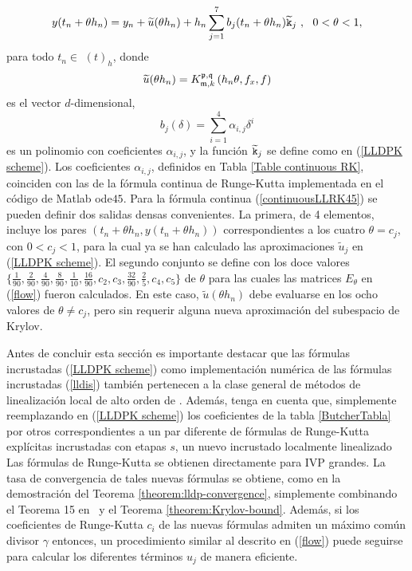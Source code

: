 \begin{equation}
    y(t_{n}+\theta h_{n})=y_n+\widetilde{u}(\theta
    h_{n})+h_{n}\sum_{j=1}^{7}b_{j}(t_{n}+\theta h_{n})\widetilde{\mathtt{k}}_{j}\
    ,\ \ 0<\theta <1,  \label{continuousLLRK45}
\end{equation}%
 para todo $t_{n} \in $ $\left( t\right) _{h}$, donde
\begin{equation*}
    \widetilde{u}(\theta h_{n}) = K_{\mathfrak{m},k}^{\mathfrak{p},\mathfrak{q}}\left(h_n\theta, f_x , f \right)
\end{equation*}
    es el vector $d$-dimensional,
\begin{equation*}
    b_{j}(\delta )=\sum\limits_{i=1}^{4}\alpha _{i,j}\delta ^{i}
\end{equation*}
es un polinomio con coeficientes $\alpha _{i,j}$, y la función $\widetilde{\mathtt{k}}_{j}$ se define como en (\ref{LLDPK scheme}). Los coeficientes $\alpha _{i,j}$, definidos en
Tabla \ref{Table continuous RK}, coinciden con las de la
fórmula continua de Runge-Kutta implementada en el código de Matlab ode$45$. Para la fórmula continua (\ref{continuousLLRK45}) se pueden definir dos salidas densas convenientes. La primera, de 4 elementos, incluye los pares $(t_{n}+\theta h_{n},y(t_{n}+\theta h_{n}))$ correspondientes a los cuatro $\theta = c_j $, con $0<c_j<1$, para la cual ya se han calculado las aproximaciones $\widetilde{u}_j$ en (\ref{LLDPK scheme}). El segundo conjunto se define con los doce valores
$\{\frac{1}{90},\frac{2}{90},\frac{4}{90},\frac{8}{90},\frac{1}{10},\frac {16}{90},c_2,c_3,\frac{32}{90},\frac{2}{5},c_4,c_5\}$ de $\theta$ para las cuales las matrices $E_\theta$ en (\ref{flow}) fueron calculados. En este caso, $\widetilde{u}(\theta h_{n})$ debe evaluarse en los ocho valores de $\theta \ne c_j$, pero sin requerir alguna nueva aproximación del subespacio de Krylov.

Antes de concluir esta sección es importante destacar que las fórmulas incrustadas (\ref{LLDPK scheme}) como implementación numérica de las fórmulas incrustadas (\ref{lldis}) también pertenecen a la clase general de métodos de linealización local de alto orden de \cite{Jimenez13}. Además, tenga en cuenta que, simplemente reemplazando en (\ref{LLDPK scheme}) los coeficientes de la tabla \ref{ButcherTabla} por otros correspondientes a un par diferente de fórmulas de Runge-Kutta explícitas incrustadas con etapas $s$, un nuevo incrustado localmente linealizado Las fórmulas de Runge-Kutta se obtienen directamente para IVP grandes. La tasa de convergencia de tales nuevas fórmulas se obtiene, como en la demostración del Teorema \ref{theorem:lldp-convergence}, simplemente combinando el Teorema 15 en~\cite{Jimenez13} y el Teorema \ref{theorem:Krylov-bound}. Además, si los coeficientes de Runge-Kutta $c_i$ de las nuevas fórmulas admiten un máximo común divisor $\gamma$ entonces, un procedimiento similar al descrito en (\ref{flow}) puede seguirse para calcular los diferentes términos $u_j$ de manera eficiente.

